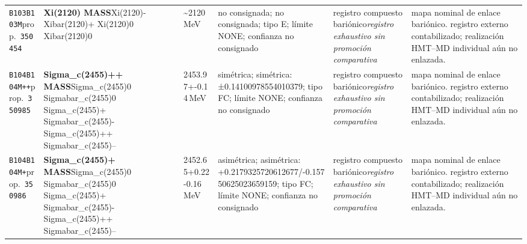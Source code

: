 \begin{landscape}
\begin{longtable}{L{1.85cm}L{4.45cm}L{2.35cm}L{4.05cm}L{3.35cm}L{7.15cm}}
\texttt{B103}\newline \texttt{B103M}\newline prop.\ \texttt{350454} & \textbf{Xi(2120) MASS}\newline Xi(2120)- \textbar{}\allowbreak{} Xibar(2120)+ \textbar{}\allowbreak{} Xi(2120)0 \textbar{}\allowbreak{} Xibar(2120)0 & \textasciitilde{}2120\,MeV & no consignada; no consignada; tipo E; límite NONE; confianza no consignado & registro compuesto bariónico\newline \emph{registro exhaustivo sin promoción comparativa} & mapa nominal de enlace bariónico. registro externo contabilizado; realización HMT--MD individual aún no enlazada. \\
\texttt{B104}\newline \texttt{B104M++}\newline prop.\ \texttt{350985} & \textbf{Sigma\_\allowbreak{}c(2455)++ MASS}\newline Sigma\_\allowbreak{}c(2455)0 \textbar{}\allowbreak{} Sigmabar\_\allowbreak{}c(2455)0 \textbar{}\allowbreak{} Sigma\_\allowbreak{}c(2455)+ \textbar{}\allowbreak{} Sigmabar\_\allowbreak{}c(2455)- \textbar{}\allowbreak{} Sigma\_\allowbreak{}c(2455)++ \textbar{}\allowbreak{} Sigmabar\_\allowbreak{}c(2455)-- & 2453.97+-0.14\,MeV & simétrica; simétrica: ±0.14100978554010379; tipo FC; límite NONE; confianza no consignado & registro compuesto bariónico\newline \emph{registro exhaustivo sin promoción comparativa} & mapa nominal de enlace bariónico. registro externo contabilizado; realización HMT--MD individual aún no enlazada. \\
\texttt{B104}\newline \texttt{B104M+}\newline prop.\ \texttt{350986} & \textbf{Sigma\_\allowbreak{}c(2455)+ MASS}\newline Sigma\_\allowbreak{}c(2455)0 \textbar{}\allowbreak{} Sigmabar\_\allowbreak{}c(2455)0 \textbar{}\allowbreak{} Sigma\_\allowbreak{}c(2455)+ \textbar{}\allowbreak{} Sigmabar\_\allowbreak{}c(2455)- \textbar{}\allowbreak{} Sigma\_\allowbreak{}c(2455)++ \textbar{}\allowbreak{} Sigmabar\_\allowbreak{}c(2455)-- & 2452.65+0.22-0.16\,MeV & asimétrica; asimétrica: +0.2179325720612677/-0.15750625023659159; tipo FC; límite NONE; confianza no consignado & registro compuesto bariónico\newline \emph{registro exhaustivo sin promoción comparativa} & mapa nominal de enlace bariónico. registro externo contabilizado; realización HMT--MD individual aún no enlazada. \\

\end{longtable}
\end{landscape}
